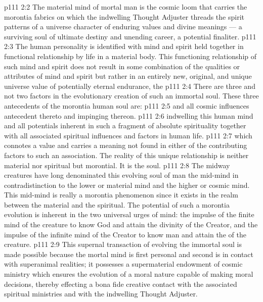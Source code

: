 \vs p111 2:2 The material mind of mortal man is the cosmic loom that carries the morontia fabrics on which the indwelling Thought Adjuster threads the spirit patterns of a universe character of enduring values and divine meanings --- a surviving soul of ultimate destiny and unending career, a potential finaliter.
\vs p111 2:3 The human personality is identified with mind and spirit held together in functional relationship by life in a material body. This functioning relationship of such mind and spirit does not result in some combination of the qualities or attributes of mind and spirit but rather in an entirely new, original, and unique universe value of potentially eternal endurance, the 
\vs p111 2:4 \pc There are three and not two factors in the evolutionary creation of such an immortal soul. These three antecedents of the morontia human soul are:
\vs p111 2:5 \bibnobreakspace {} and all cosmic influences antecedent thereto and impinging thereon.
\vs p111 2:6 \bibnobreakspace {} indwelling this human mind and all potentials inherent in such a fragment of absolute spirituality together with all associated spiritual influences and factors in human life.
\vs p111 2:7 \bibnobreakspace {} which connotes a value and carries a meaning not found in either of the contributing factors to such an association. The reality of this unique relationship is neither material nor spiritual but morontial. It is the soul.
\vs p111 2:8 \pc The midway creatures have long denominated this evolving soul of man the mid\hyp{}mind in contradistinction to the lower or material mind and the higher or cosmic mind. This mid\hyp{}mind is really a morontia phenomenon since it exists in the realm between the material and the spiritual. The potential of such a morontia evolution is inherent in the two universal urges of mind: the impulse of the finite mind of the creature to know God and attain the divinity of the Creator, and the impulse of the infinite mind of the Creator to know man and attain the  of the creature.
\vs p111 2:9 This supernal transaction of evolving the immortal soul is made possible because the mortal mind is first personal and second is in contact with superanimal realities; it possesses a supermaterial endowment of cosmic ministry which ensures the evolution of a moral nature capable of making moral decisions, thereby effecting a bona fide creative contact with the associated spiritual ministries and with the indwelling Thought Adjuster.
